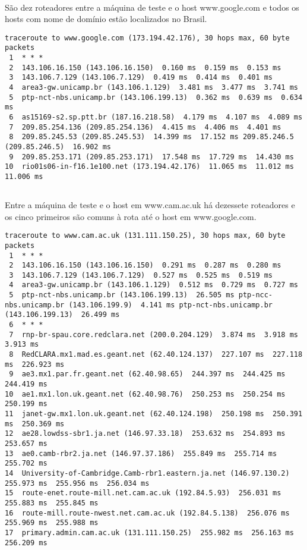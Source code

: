 \documentclass[a4paper,10pt,oneside,final,titlepage,onecolumn]{article}
\begin{document}
\paragraph{}São dez roteadores entre a máquina de teste e o host \mbox{www.google.com} e todos os hosts com nome de domínio estão localizados no Brasil.
\begin{lstlisting}
traceroute to www.google.com (173.194.42.176), 30 hops max, 60 byte packets
 1  * * *
 2  143.106.16.150 (143.106.16.150)  0.160 ms  0.159 ms  0.153 ms
 3  143.106.7.129 (143.106.7.129)  0.419 ms  0.414 ms  0.401 ms
 4  area3-gw.unicamp.br (143.106.1.129)  3.481 ms  3.477 ms  3.741 ms
 5  ptp-nct-nbs.unicamp.br (143.106.199.13)  0.362 ms  0.639 ms  0.634 ms
 6  as15169-s2.sp.ptt.br (187.16.218.58)  4.179 ms  4.107 ms  4.089 ms
 7  209.85.254.136 (209.85.254.136)  4.415 ms  4.406 ms  4.401 ms
 8  209.85.245.53 (209.85.245.53)  14.399 ms  17.152 ms 209.85.246.5 (209.85.246.5)  16.902 ms
 9  209.85.253.171 (209.85.253.171)  17.548 ms  17.729 ms  14.430 ms
10  rio01s06-in-f16.1e100.net (173.194.42.176)  11.065 ms  11.012 ms  11.006 ms
\end{lstlisting}

\subsection{}
\paragraph{}Entre a máquina de teste e o host em \mbox{www.cam.ac.uk} há dezessete roteadores e os cinco primeiros são comuns à rota até o host em \mbox{www.google.com}.
\begin{lstlisting}
traceroute to www.cam.ac.uk (131.111.150.25), 30 hops max, 60 byte packets
 1  * * *
 2  143.106.16.150 (143.106.16.150)  0.291 ms  0.287 ms  0.280 ms
 3  143.106.7.129 (143.106.7.129)  0.527 ms  0.525 ms  0.519 ms
 4  area3-gw.unicamp.br (143.106.1.129)  0.512 ms  0.729 ms  0.727 ms
 5  ptp-nct-nbs.unicamp.br (143.106.199.13)  26.505 ms ptp-ncc-nbs.unicamp.br (143.106.199.9)  4.141 ms ptp-nct-nbs.unicamp.br (143.106.199.13)  26.499 ms
 6  * * *
 7  rnp-br-spau.core.redclara.net (200.0.204.129)  3.874 ms  3.918 ms  3.913 ms
 8  RedCLARA.mx1.mad.es.geant.net (62.40.124.137)  227.107 ms  227.118 ms  226.923 ms
 9  ae3.mx1.par.fr.geant.net (62.40.98.65)  244.397 ms  244.425 ms  244.419 ms
10  ae1.mx1.lon.uk.geant.net (62.40.98.76)  250.253 ms  250.254 ms  250.199 ms
11  janet-gw.mx1.lon.uk.geant.net (62.40.124.198)  250.198 ms  250.391 ms  250.369 ms
12  ae28.lowdss-sbr1.ja.net (146.97.33.18)  253.632 ms  254.893 ms  253.657 ms
13  ae0.camb-rbr2.ja.net (146.97.37.186)  255.849 ms  255.714 ms  255.702 ms
14  University-of-Cambridge.Camb-rbr1.eastern.ja.net (146.97.130.2)  255.973 ms  255.956 ms  256.034 ms
15  route-enet.route-mill.net.cam.ac.uk (192.84.5.93)  256.031 ms  255.883 ms  255.845 ms
16  route-mill.route-nwest.net.cam.ac.uk (192.84.5.138)  256.076 ms  255.969 ms  255.988 ms
17  primary.admin.cam.ac.uk (131.111.150.25)  255.982 ms  256.163 ms  256.209 ms
\end{lstlisting}
\end{document}
